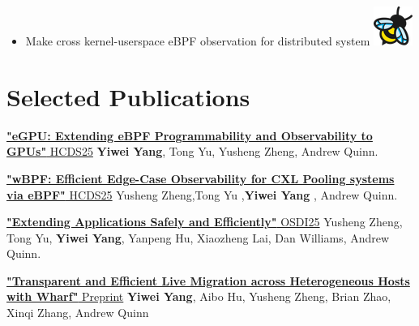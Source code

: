 \documentclass{resume}
\newcommand{\en}[1]{#1}
\newcommand{\zh}[1]{}
\begin{document}
\begin{itemize}
      \item \small{ \en{Make cross kernel-userspace eBPF observation for distributed system}
      \zh{设计一种基于用户态内核态eBPF协同工作的分布式系统。}}\includegraphics[width=\linewidth/40]{ebpf.png}
\end{itemize}

\section{\en{Selected Publications}\zh{主要论文}}

\href{https://dl.acm.org/doi/10.1145/3723851.3726984}{\textbf{"eGPU: Extending eBPF Programmability and Observability to GPUs"} HCDS25} \textbf{Yiwei Yang}, Tong Yu, Yusheng Zheng, Andrew Quinn.

\href{https://dl.acm.org/doi/10.1145/3723851.3726985}{\textbf{"wBPF: Efficient Edge-Case Observability for CXL Pooling systems via eBPF"} HCDS25} Yusheng Zheng,Tong Yu ,\textbf{Yiwei Yang} , Andrew Quinn.

\href{https://arxiv.org/pdf/2311.07923}{\textbf{"Extending Applications Safely and Efficiently"} OSDI25} Yusheng Zheng, Tong Yu, \textbf{Yiwei Yang}, Yanpeng Hu, Xiaozheng Lai, Dan Williams, Andrew Quinn.

\href{https://arxiv.org/pdf/2410.15894}{\textbf{"Transparent and Efficient Live Migration across Heterogeneous Hosts with Wharf"} Preprint} \textbf{Yiwei Yang}, Aibo Hu, Yusheng Zheng, Brian Zhao, Xinqi Zhang, Andrew Quinn
\end{document}
